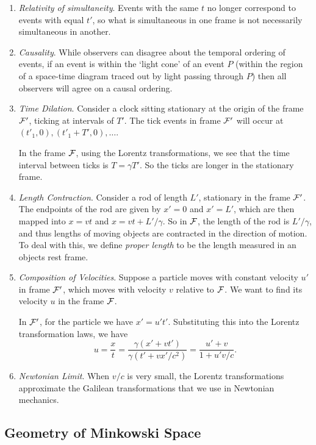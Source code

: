 \documentclass{scrartcl}
\theoremstyle{definition}
\begin{document}
\begin{enumerate}
	\item \emph{Relativity of simultaneity}. Events with the same $t$ no longer correspond to events with equal $t'$, so what is simultaneous in one frame is not necessarily simultaneous in another.
	\item \emph{Causality}. While observers can disagree about the temporal ordering of events, if an event is within the `light cone' of an event $P$ (within the region of a space-time diagram traced out by light passing through $P$) then all observers will agree on a causal ordering.  
	\item \emph{Time Dilation}. Consider a clock sitting stationary at the origin of the frame $\mathcal{F}'$, ticking at intervals of $T'$. The tick events in frame $\mathcal{F}'$ will occur at $(t'_1, 0), (t'_1 + T', 0), \dots$. 
	
	In the frame $\mathcal{F}$, using the Lorentz transformations, we see that the time interval between ticks is $T = \gamma T'$. So the ticks are longer in the stationary frame. 
	\item \emph{Length Contraction}. Consider a rod of length $L'$, stationary in the frame $\mathcal{F}'$. 
	The endpoints of the rod are given by $x' = 0$ and $x' = L'$, which are then mapped into $x = vt$ and $x = vt + L'/\gamma$. 
	So in $\mathcal{F}$, the length of the rod is $L'/\gamma$, and thus lengths of moving objects are contracted in the direction of motion. To deal with this, we define \emph{proper length} to be the length measured in an objects rest frame.
	\item \emph{Composition of Velocities}. Suppose a particle moves with constant velocity $u'$ in frame $\mathcal{F}'$, which moves with velocity $v$ relative to $\mathcal{F}$. We want to find its velocity $u$ in the frame $\mathcal{F}$.

	In $\mathcal{F}'$, for the particle we have $x' = u't'$. Substituting this into the Lorentz transformation laws, we have
	$$
	u = \frac{x}{t} = \frac{\gamma(x' + vt')}{\gamma(t' + vx'/c^2)} = \frac{u' + v}{1 + u' v/c}.
	$$
	\item \emph{Newtonian Limit}. When $v/c$ is very small, the Lorentz transformations approximate the Galilean transformations that we use in Newtonian mechanics.
\end{enumerate}


\subsection*{Geometry of Minkowski Space}
\end{document}
